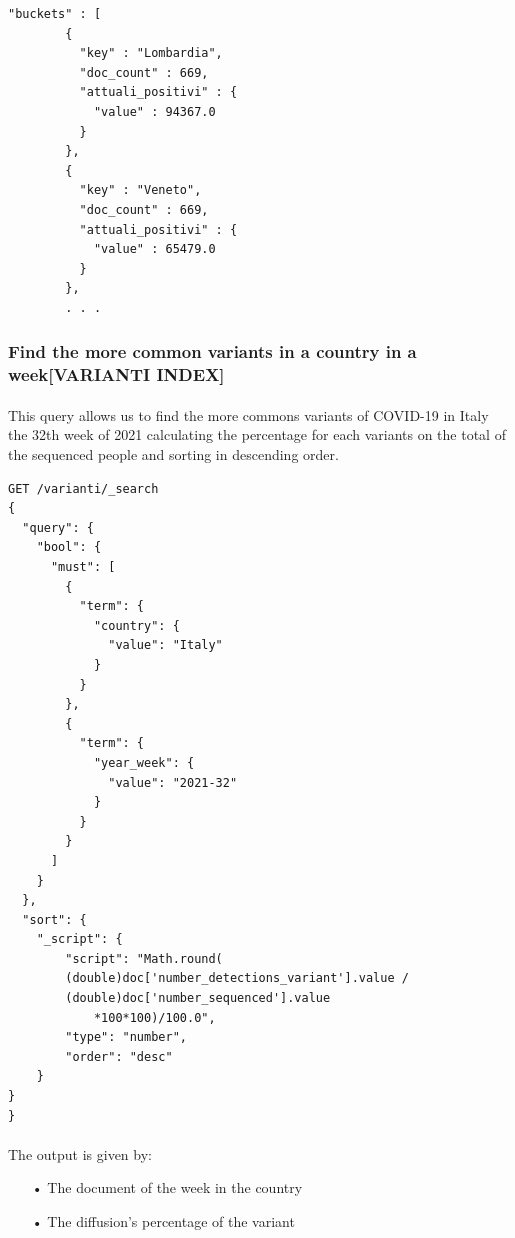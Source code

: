 \documentclass[a4paper,12pt]{article}
\begin{document}
\begin{tcolorbox}[colback=red!5!white,colframe=red!75!black,title=OUTPUT]
\begin{verbatim}
"buckets" : [
        {
          "key" : "Lombardia",
          "doc_count" : 669,
          "attuali_positivi" : {
            "value" : 94367.0
          }
        },
        {
          "key" : "Veneto",
          "doc_count" : 669,
          "attuali_positivi" : {
            "value" : 65479.0
          }
        },
        . . .
\end{verbatim}
\end{tcolorbox}
\newpage

\subsubsection{Find the more common variants in a country in a week[VARIANTI INDEX]  }
\paragraph{} This query allows us to find the more commons variants of COVID-19 in Italy the 32th week of 2021 calculating the percentage for each variants on the total of the sequenced people and sorting in descending order.
\begin{tcolorbox}[colback=green!5!white,colframe=green!75!black,title=QUERY]
\begin{verbatim}
GET /varianti/_search
{
  "query": {
    "bool": {
      "must": [
        {
          "term": {
            "country": {
              "value": "Italy"
            }
          }
        },
        {
          "term": {
            "year_week": {
              "value": "2021-32"
            }
          }
        }
      ]
    }
  },
  "sort": {
    "_script": {
        "script": "Math.round(
        (double)doc['number_detections_variant'].value / 
        (double)doc['number_sequenced'].value 
        	*100*100)/100.0",
        "type": "number",
        "order": "desc"
    }
}
}
\end{verbatim}
\end{tcolorbox}
\newpage

\paragraph{} The output is given by: 
\begin{itemize}[noitemsep]
\item[•] The document of the week in the country
\item[•] The diffusion's percentage of the variant
\end{itemize}
\end{document}
